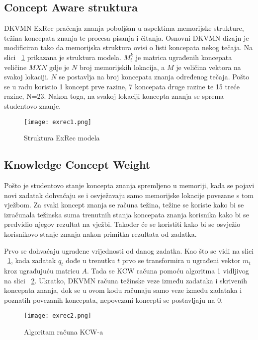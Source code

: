 \subsection{Concept Aware struktura}
DKVMN ExRec praćenja znanja poboljšan u aspektima memorijske strukture, težina koncepata znanja te procesa pisanja i čitanja. Osnovni DKVMN dizajn je modificiran tako da memorijska struktura ovisi o listi koncepata nekog tečaja. Na slici
~\ref{fig:exrec1} prikazana je struktura modela. $M^k_t$ je matrica ugrađenih koncepata veličine $M X N$ gdje je $N$ broj memorijskih lokacija, a $M$ je veličina vektora na svakoj lokaciji. $N$ se postavlja na broj koncepata znanja određenog tečaja. Pošto se u radu koristio 1 koncept prve razine, 7 koncepata druge razine te 15 treće razine, N=23. Nakon toga, na svakoj lokaciji koncepta znanja se sprema studentovo znanje.


	\begin{figure}[!htb]
	\centering
	\texttt{[image: exrec1.png]}
	\caption{Struktura ExRec modela}
	\label{fig:exrec1}
\end{figure}


\subsection{Knowledge Concept Weight}

Pošto je studentovo stanje koncepta znanja spremljeno u memoriji, kada se pojavi novi zadatak dohvaćaju se i osvježavaju samo memorijske lokacije povezane s tom vježbom. Za svaki koncept znanja se računa težina, težine se koriste kako bi se izračunala težinska suma trenutnih stanja koncepata znanja korisnika kako bi se predvidio njegov rezultat na vježbi. Također će se koristiti kako bi se osvježio korisnikovo stanje znanja nakon primitka rezultata od zadatka.

Prvo se dohvaćaju ugrađene vrijednosti od danog zadatka. Kao što se vidi na slici ~\ref{fig:exrec1}, kada zadatak $q_t$ dođe u trenutku $t$ prvo se transformira u ugrađeni vektor $m_t$ kroz ugrađujuću matricu $A$. Tada se KCW računa pomoću algoritma 1 vidljivog na slici ~\ref{fig:exrec2}. Ukratko, DKVMN računa težinske veze između zadataka i skrivenih koncepata znanja, dok se u ovom kodu računaju samo veze između zadataka i poznatih povezanih koncepata, nepovezani koncepti se postavljaju na 0.


	\begin{figure}[!htb]
	\centering
	\texttt{[image: exrec2.png]}
	\caption{Algoritam računa KCW-a}
	\label{fig:exrec2}
\end{figure}



